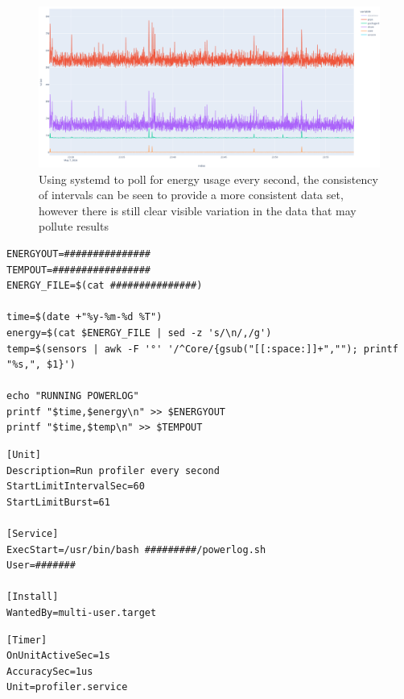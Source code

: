 \begin{figure}[H]
    \centering
    \includegraphics[width=15cm]{figures/introduction/systemd_energy_polling}
    \caption{Using systemd to poll for energy usage every second, the consistency of intervals can be seen to provide a
    more consistent data set, however there is still clear visible variation in the data that may pollute results}
    \label{fig:systemd_energy_polling}
\end{figure}

\begin{lstlisting}[caption={power and temperature logging script},captionpos=b,label={lst:powerlog-script}]
ENERGYOUT=###############
TEMPOUT=#################
ENERGY_FILE=$(cat ###############)

time=$(date +"%y-%m-%d %T")
energy=$(cat $ENERGY_FILE | sed -z 's/\n/,/g')
temp=$(sensors | awk -F '°' '/^Core/{gsub("[[:space:]]+",""); printf "%s,", $1}')

echo "RUNNING POWERLOG"
printf "$time,$energy\n" >> $ENERGYOUT
printf "$time,$temp\n" >> $TEMPOUT
\end{lstlisting}
\begin{lstlisting}[caption={systemd service},captionpos=b,label={lst:systemd-energy-polling}]
[Unit]
Description=Run profiler every second
StartLimitIntervalSec=60
StartLimitBurst=61

[Service]
ExecStart=/usr/bin/bash #########/powerlog.sh
User=#######

[Install]
WantedBy=multi-user.target
\end{lstlisting}
\begin{lstlisting}[caption={systemd timer},captionpos=b,label={lst:systemd-energy-timer}]
[Timer]
OnUnitActiveSec=1s
AccuracySec=1us
Unit=profiler.service
\end{lstlisting}
